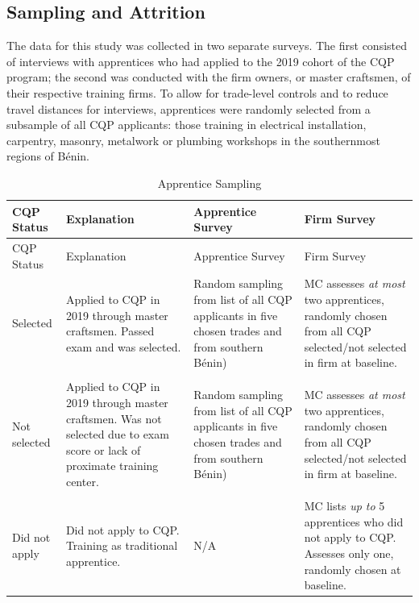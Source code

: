 \documentclass[
  11pt,
a4paper
]{article}
\begin{document}
\hypertarget{sampling-and-attrition}{%
\subsection{Sampling and Attrition}\label{sampling-and-attrition}}

The data for this study was collected in two separate surveys. The first consisted of interviews with apprentices who had applied to the 2019 cohort of the CQP program; the second was conducted with the firm owners, or master craftsmen, of their respective training firms. To allow for trade-level controls and to reduce travel distances for interviews, apprentices were randomly selected from a subsample of all CQP applicants: those training in electrical installation, carpentry, masonry, metalwork or plumbing workshops in the southernmost regions of Bénin.

\begin{longtable}[]{@{}
  >{\raggedright\arraybackslash}p{}
  >{\raggedright\arraybackslash}p{}
  >{\raggedright\arraybackslash}p{}
  >{\raggedright\arraybackslash}p{}@{}}
\caption{\label{tab:sampling} Apprentice Sampling}\tabularnewline
\toprule
CQP Status & Explanation & Apprentice Survey & Firm Survey \\
\midrule
\endfirsthead
\toprule
CQP Status & Explanation & Apprentice Survey & Firm Survey \\
\midrule
\endhead
Selected & Applied to CQP in 2019 through master craftsmen. Passed exam and was selected. & Random sampling from list of all CQP applicants in five chosen trades and from southern Bénin) & MC assesses \emph{at most} two apprentices, randomly chosen from all CQP selected/not selected in firm at baseline. \\
& & & \\
Not selected & Applied to CQP in 2019 through master craftsmen. Was not selected due to exam score or lack of proximate training center. & Random sampling from list of all CQP applicants in five chosen trades and from southern Bénin) & MC assesses \emph{at most} two apprentices, randomly chosen from all CQP selected/not selected in firm at baseline. \\
& & & \\
Did not apply & Did not apply to CQP. Training as traditional apprentice. & N/A & MC lists \emph{up to} 5 apprentices who did not apply to CQP. Assesses only one, randomly chosen at baseline. \\
\bottomrule
\end{longtable}
\end{document}
